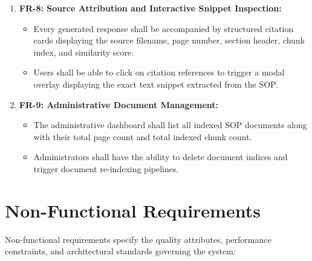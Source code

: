 \begin{enumerate}
\begin{itemize}
    \end{itemize}
    \item \textbf{FR-8: Source Attribution and Interactive Snippet Inspection:}
    \begin{itemize}
        \item Every generated response shall be accompanied by structured citation cards displaying the source filename, page number, section header, chunk index, and similarity score.
        \item Users shall be able to click on citation references to trigger a modal overlay displaying the exact text snippet extracted from the SOP.
    \end{itemize}
    \item \textbf{FR-9: Administrative Document Management:}
    \begin{itemize}
        \item The administrative dashboard shall list all indexed SOP documents along with their total page count and total indexed chunk count.
        \item Administrators shall have the ability to delete document indices and trigger document re-indexing pipelines.
    \end{itemize}
\end{enumerate}

\section{Non-Functional Requirements}
\label{sec:req_non_functional}

Non-functional requirements specify the quality attributes, performance constraints, and architectural standards governing the system:

